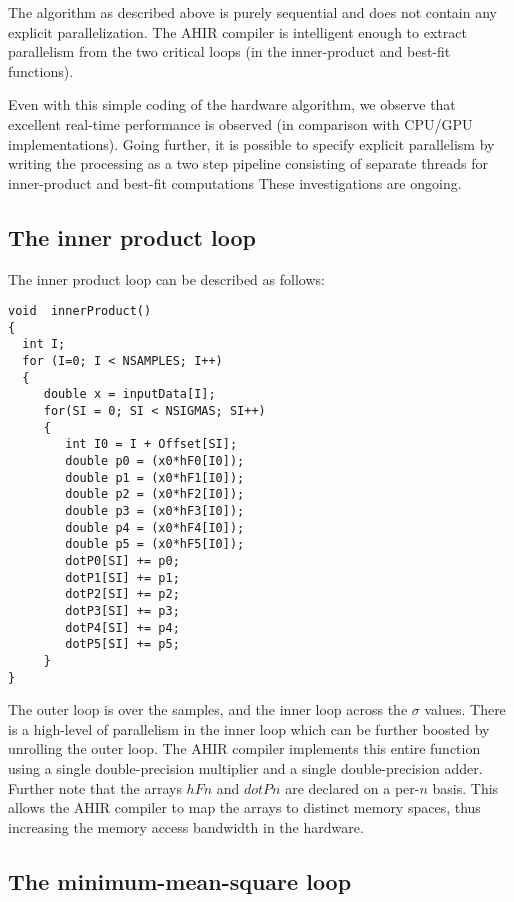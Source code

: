 \documentclass[runningheads]{llncs}
\begin{document}
The algorithm as described above is purely sequential
and does not contain any explicit parallelization.  The AHIR compiler
is intelligent enough to extract parallelism from the two critical
loops (in the inner-product and best-fit functions).

Even with this simple coding of the hardware algorithm,
we observe that excellent real-time performance
is observed (in comparison with CPU/GPU implementations).
Going further, it is possible to specify explicit parallelism by
writing the processing as a two step pipeline consisting
of separate threads for inner-product and best-fit
computations  These investigations are ongoing.



\subsection{The inner product loop}

The inner product loop can be described as follows:
\begin{verbatim}
void  innerProduct()
{
  int I;
  for (I=0; I < NSAMPLES; I++)
  {
     double x = inputData[I];
     for(SI = 0; SI < NSIGMAS; SI++)
     {
        int I0 = I + Offset[SI];
        double p0 = (x0*hF0[I0]);
        double p1 = (x0*hF1[I0]);
        double p2 = (x0*hF2[I0]);
        double p3 = (x0*hF3[I0]);
        double p4 = (x0*hF4[I0]);
        double p5 = (x0*hF5[I0]);
        dotP0[SI] += p0;
        dotP1[SI] += p1;
        dotP2[SI] += p2;
        dotP3[SI] += p3;
        dotP4[SI] += p4;
        dotP5[SI] += p5;
     }
}
\end{verbatim}
The outer loop is over the samples, and the inner
loop across the $\sigma$ values.  There is a high-level
of parallelism in the inner loop which can be further
boosted by unrolling the outer loop.   The AHIR compiler
implements this entire function using a single double-precision
multiplier and a single double-precision adder.  Further
note that the arrays $hFn$ and $dotPn$ are declared on
a per-$n$ basis. This allows the AHIR compiler to
map the arrays to distinct memory spaces, thus increasing
the memory access bandwidth in the hardware.

\subsection{The minimum-mean-square loop}
\end{document}

